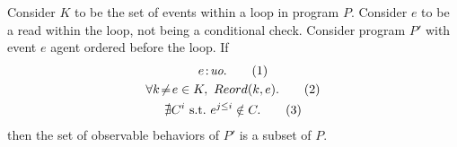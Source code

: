 \begin{corollary}
    \label{LoopInvCodeMotRead1}
    Consider $K$ to be the set of events within a loop in program $P$. 
    Consider $e$ to be a read within the loop, not being a conditional check. 
    Consider program $P'$ with event $e$ agent ordered before the loop. 
    If
    \begin{gather}
        e\!:\!\textit{uo}. \tag{1} \label{licmr1:eq1}\\
        \forall k\!\neq\!e \in K, \ Reord(k, e). \tag{2} \label{licmr1:eq2}\\ 
        \nexists C^i \ \text{s.t.} \ e^{j \leq i} \notin C. \tag{3} \label{licmr1:eq3}                    
    \end{gather}
    then the set of observable behaviors of $P'$ is a subset of $P$.

\end{corollary}

